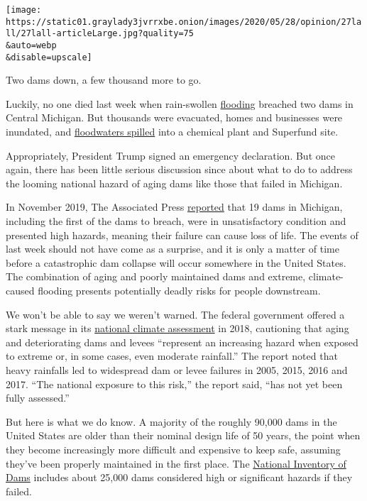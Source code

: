 \texttt{[image: https://static01.graylady3jvrrxbe.onion/images/2020/05/28/opinion/27lall/27lall-articleLarge.jpg?quality=75\\\&auto=webp\\\&disable=upscale]}

Two dams down, a few thousand more to go.

Luckily, no one died last week when rain-swollen
\href{https://www.nytimes3xbfgragh.onion/interactive/2020/06/29/climate/hidden-flood-risk-maps.html}{flooding}
breached two dams in Central Michigan. But thousands were evacuated,
homes and businesses were inundated, and
\href{https://www.nytimes3xbfgragh.onion/reuters/2020/05/21/us/21reuters-usa-flood-michigan.html}{floodwaters
spilled} into a chemical plant and Superfund site.

Appropriately, President Trump signed an emergency declaration. But once
again, there has been little serious discussion since about what to do
to address the looming national hazard of aging dams like those that
failed in Michigan.

In November 2019, The Associated Press
\href{https://apnews.com/f5f09a300d394900a1a88362238dbf77}{reported}
that 19 dams in Michigan, including the first of the dams to breach,
were in unsatisfactory condition and presented high hazards, meaning
their failure can cause loss of life. The events of last week should not
have come as a surprise, and it is only a matter of time before a
catastrophic dam collapse will occur somewhere in the United States. The
combination of aging and poorly maintained dams and extreme,
climate-caused flooding presents potentially deadly risks for people
downstream.

We won't be able to say we weren't warned. The federal government
offered a stark message in its
\href{https://nca2018.globalchange.gov/chapter/3/}{national climate
assessment} in 2018, cautioning that aging and deteriorating dams and
levees ``represent an increasing hazard when exposed to extreme or, in
some cases, even moderate rainfall.'' The report noted that heavy
rainfalls led to widespread dam or levee failures in 2005, 2015, 2016
and 2017. ``The national exposure to this risk,'' the report said, ``has
not yet been fully assessed.''

But here is what we do know. A majority of the roughly 90,000 dams in
the United States are older than their nominal design life of 50 years,
the point when they become increasingly more difficult and expensive to
keep safe, assuming they've been properly maintained in the first place.
The \href{https://nid.sec.usace.army.mil/ords/f?p=105:1::::::}{National
Inventory of Dams} includes about 25,000 dams considered high or
significant hazards if they failed.

